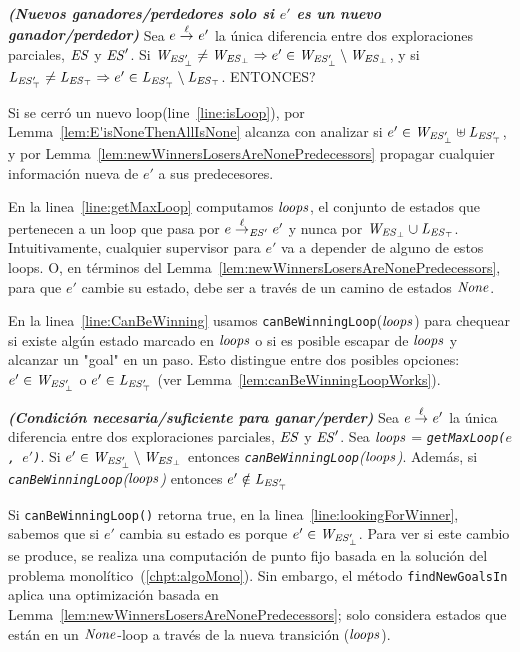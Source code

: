 \begin{lemma}\textbf{\emph{(Nuevos ganadores/perdedores solo si $e'$ es un nuevo ganador/perdedor)}}
\label{lem:E'isNoneThenAllIsNone}
Sea $e \overset{\ell}{\rightarrow}_{} e'$ la única diferencia entre dos exploraciones parciales, $\mathit{ES}$ y $\mathit{ES}'$. Si $\mathit{W_{\mathit{\mathit{ES}'_{\bot}}}} \neq \mathit{W_{\mathit{\mathit{ES}_{\bot}}}} \Rightarrow e' \in \mathit{W_{\mathit{\mathit{ES}'_{\bot}}}} \setminus \mathit{W_{\mathit{\mathit{ES}_{\bot}}}}$, y si $\mathit{L_{\mathit{\mathit{ES}'_{\top}}}} \neq \mathit{L_{\mathit{\mathit{ES}_{\top}}}} \Rightarrow e' \in \mathit{L_{\mathit{\mathit{ES}'_{\top}}}} \setminus \mathit{L_{\mathit{\mathit{ES}_{\top}}}}$. ENTONCES?
\end{lemma}


Si se cerró un nuevo loop(line~\ref{line:isLoop}), por Lemma~\ref{lem:E'isNoneThenAllIsNone} alcanza con analizar si $e' 
\in \mathit{W_{\mathit{\mathit{ES}'_{\bot}}}} \uplus \mathit{L_{\mathit{\mathit{ES}'_{\top}}}}$, y por Lemma~\ref{lem:newWinnersLosersAreNonePredecessors} propagar cualquier información nueva de $e'$ a sus predecesores. 

En la linea~\ref{line:getMaxLoop} computamos $\mathit{loops}$, el conjunto de estados que pertenecen a un loop que pasa por $e \overset{\ell}{\rightarrow}_{\mathit{ES}'} e'$ y nunca por $\mathit{W_{\mathit{\mathit{ES}_{\bot}}}} \cup \mathit{L_{\mathit{\mathit{ES}_{\top}}}}$. 
Intuitivamente, cualquier supervisor para $e'$ va a depender de alguno de estos loops. O, en términos del Lemma~\ref{lem:newWinnersLosersAreNonePredecessors}, para que $e'$ cambie su estado, debe ser a través de un camino de estados $\mathit{None}$. 

En la linea~\ref{line:CanBeWinning} usamos \texttt{canBeWinningLoop}($\mathit{loops}$) para chequear si existe algún estado marcado en $\mathit{loops}$ o si es posible escapar de $\mathit{loops}$ y alcanzar un "goal" en un paso. Esto distingue entre dos posibles opciones: $e' \in \mathit{W_{\mathit{\mathit{ES}'_{\bot}}}}$ o $e' \in \mathit{L_{\mathit{\mathit{ES}'_{\top}}}}$ (ver 
Lemma~\ref{lem:canBeWinningLoopWorks}). 

\begin{lemma}\textbf{\emph{(Condición necesaria/suficiente para ganar/perder)}}
\label{lem:canBeWinningLoopWorks}
Sea $e \overset{\ell}{\rightarrow}_{} e'$ la única diferencia entre dos exploraciones parciales, 
$\mathit{ES}$ y $\mathit{ES}'$. Sea $\mathit{loops}$ = \emph{\texttt{getMaxLoop($e$, 
$e'$)}}.
Si $e' \in \mathit{W_{\mathit{\mathit{ES}'_{\bot}}}} \setminus \mathit{W_{\mathit{\mathit{ES}_{\bot}}}}$ 
entonces \emph{\texttt{canBeWinningLoop}($\mathit{loops}$)}. Además, si \\ 
\emph{\texttt{canBeWinningLoop}($\mathit{loops}$)} entonces $e' \notin \mathit{L_{\mathit{\mathit{ES}'_{\top}}}}$ 
\end{lemma}


Si \texttt{canBeWinningLoop()} retorna true, en la  linea~\ref{line:lookingForWinner}, 
sabemos que si $e'$ cambia su estado es porque $e' \in \mathit{W_{\mathit{\mathit{ES}'_{\bot}}}}$. Para ver si este cambio se produce, se realiza una computación de punto fijo basada en la solución del problema monolítico~(\ref{chpt:algoMono}). 
Sin embargo, el método \texttt{findNewGoalsIn} aplica una optimización basada en Lemma~\ref{lem:newWinnersLosersAreNonePredecessors}; solo considera estados que están en un $\mathit{None}$-loop a través de la nueva transición ($\mathit{loops}$).

